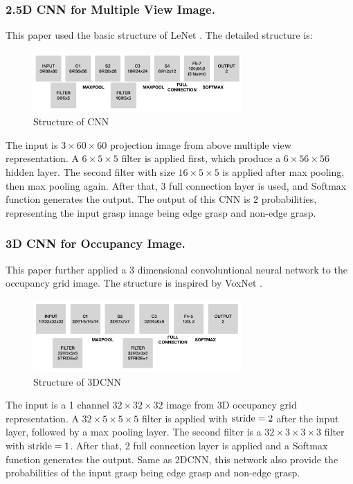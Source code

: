 \documentclass[letterpaper]{article} %
\begin{document}
\subsubsection{2.5D CNN for Multiple View Image.} This paper used the basic structure of LeNet \cite{RN3}. The detailed structure is:
\begin{figure}[H]
    \centering
    \includegraphics[width=8cm]{images/CNN.png}
    \caption{Structure of CNN}
    \label{fig:my_label}
\end{figure}
The input is $3\times60\times60$ projection image from above multiple view representation. A $6\times5\times5$ filter is applied first, which produce a $6\times56\times56$ hidden layer. The second filter with size $16\times5\times5$ is applied after max pooling, then max pooling again. After that, 3 full connection layer is used, and Softmax function generates the output. The output of this CNN is 2 probabilities, representing the input grasp image being edge grasp and non-edge grasp.

\subsubsection{3D CNN for Occupancy Image.} This paper further applied a 3 dimensional convoluntional neural network to the occupancy grid image. The structure is inspired by VoxNet \cite{RN4}. 
\begin{figure}[H]
    \centering
    \includegraphics[width=8cm]{images/3DCNN.png}
    \caption{Structure of 3DCNN}
    \label{fig:my_label}
\end{figure}
The input is a 1 channel $32\times 32\times 32$ image from 3D occupancy grid representation. A $32\times 5 \times 5\times 5$ filter is applied with ${\rm stride}=2$ after the input layer, followed by a max pooling layer. The second filter is a $32\times 3\times 3\times3$ filter with ${\rm stride}=1$. After that, 2 full connection layer is applied and a Softmax function generates the output. Same as 2DCNN, this network also provide the probabilities of the input grasp being edge grasp and non-edge grasp.
\end{document}
